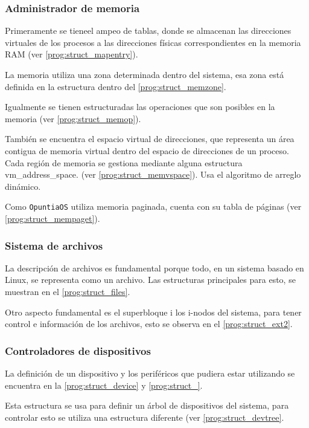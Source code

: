 	
	
	\subsubsection{Administrador de memoria}
		Primeramente se tieneel ampeo de tablas, donde se almacenan las direcciones virtuales de los procesos a las direcciones físicas correspondientes en la memoria RAM (ver \autoref{prog:struct_mapentry}).
		
		La memoria utiliza una zona determinada dentro del sistema, esa zona está definida en la estructura dentro del \autoref{prog:struct_memzone}.
		
		Igualmente se tienen estructuradas las operaciones que son posibles en la memoria (ver \autoref{prog:struct_memop}).
		
		También se encuentra el espacio virtual de direcciones, que representa un área contigua de memoria virtual dentro del espacio de direcciones de un proceso. Cada región de memoria se gestiona mediante alguna estructura vm\_address\_space. (ver \autoref{prog:struct_memvspace}). Usa el algoritmo de arreglo dinámico.
		
		Como \texttt{OpuntiaOS} utiliza memoria paginada, cuenta con su tabla de páginas  (ver \autoref{prog:struct_mempaget}).
		
		
		
	\subsubsection{Sistema de archivos}
		La descripción de archivos es fundamental porque todo, en un sistema basado en Linux, se representa como un archivo. Las estructuras principales para esto, se muestran en el \autoref{prog:struct_files}.
		
		Otro aspecto fundamental es el superbloque i los i-nodos del sistema, para tener control e información de los archivos, esto se observa en el \autoref{prog:struct_ext2}.
		
		
		
	
	\subsubsection{Controladores de dispositivos}
		La definición de un dispositivo y los periféricos que pudiera estar utilizando se encuentra en la  \autoref{prog:struct_device} y \autoref{prog:struct_}.
		
		Esta estructura se usa para definir un árbol de dispositivos del sistema, para controlar esto se utiliza una estructura diferente (ver \autoref{prog:struct_devtree}.
		
	
	

	
	